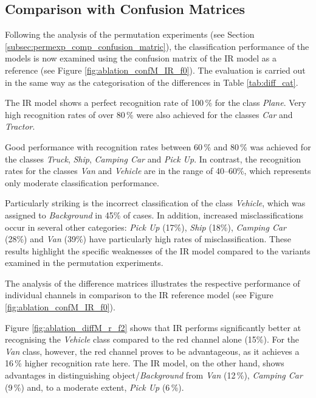 \FloatBarrier
\subsection*{Comparison with Confusion Matrices}
\label{subsec:ablation_comp_confusion_matric}

Following the analysis of the permutation experiments (see Section \ref{subsec:permexp_comp_confusion_matric}), the classification performance of the models is now examined using the confusion matrix of the IR model as a reference (see Figure \ref{fig:ablation_confM_IR_f0}). The evaluation is carried out in the same way as the categorisation of the differences in Table \ref{tab:diff_cat}.  

The IR model shows a perfect recognition rate of 100\,\% for the class \textit{Plane}. Very high recognition rates of over 80\,\% were also achieved for the classes \textit{Car} and \textit{Tractor}.

Good performance with recognition rates between 60\,\% and 80\,\% was achieved for the classes \textit{Truck}, \textit{Ship}, \textit{Camping Car} and \textit{Pick Up}. In contrast, the recognition rates for the classes \textit{Van} and \textit{Vehicle} are in the range of 40–60\%, which represents only moderate classification performance. 

Particularly striking is the incorrect classification of the class \textit{Vehicle}, which was assigned to \textit{Background} in 45\% of cases. In addition, increased misclassifications occur in several other categories: \textit{Pick Up} (17\%), \textit{Ship} (18\%), \textit{Camping Car} (28\%) and \textit{Van} (39\%) have particularly high rates of misclassification. These results highlight the specific weaknesses of the IR model compared to the variants examined in the permutation experiments.
  


The analysis of the difference matrices illustrates the respective performance of individual channels in comparison to the IR reference model (see Figure \ref{fig:ablation_confM_IR_f0}).

Figure \ref{fig:ablation_diffM_r_f2} shows that IR performs significantly better at recognising the \textit{Vehicle} class compared to the red channel alone (15\%). For the \textit{Van} class, however, the red channel proves to be advantageous, as it achieves a 16\,\% higher recognition rate here. The IR model, on the other hand, shows advantages in distinguishing object/\textit{Background} from \textit{Van} (12\,\%), \textit{Camping Car} (9\,\%) and, to a moderate extent, \textit{Pick Up} (6\,\%).
    
